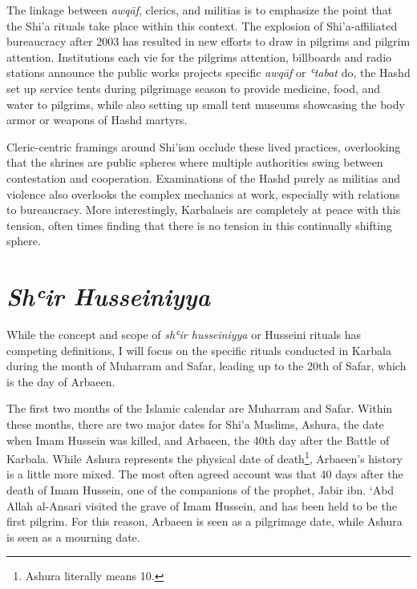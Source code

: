 The linkage between \emph{awqāf}, clerics, and militias is to emphasize the point that the Shi'a rituals take place within this context. The explosion of Shi'a-affiliated bureaucracy after 2003 has resulted in new efforts to draw in pilgrims and pilgrim attention. Institutions each vie for the pilgrims attention, billboards and radio stations announce the public works projects specific \emph{awqāf} or \emph{ʿtabat} do, the Hashd set up service tents during pilgrimage season to provide medicine, food, and water to pilgrims, while also setting up small tent museums showcasing the body armor or weapons of Hashd martyrs. 

Cleric-centric framings around Shi'ism occlude these lived practices, overlooking that the shrines are public spheres where multiple authorities swing between contestation and cooperation. Examinations of the Hashd purely as militias and violence also overlooks the complex mechanics at work, especially with relations to bureaucracy. More interestingly, Karbalaeis are completely at peace with this tension, often times finding that there is no tension in this continually shifting sphere.


\section{\emph{Shʿir Husseiniyya}}
While the concept and scope of \emph{shʿir husseiniyya} or Husseini rituals has competing definitions, I will focus on the specific rituals conducted in Karbala during the month of Muharram and Safar, leading up to the 20th of Safar, which is the day of Arbaeen. 

The first two months of the Islamic calendar are Muharram and Safar. Within these months, there are two major dates for Shi’a Muslims, Ashura, the date when Imam Hussein was killed, and Arbaeen, the 40th day after the Battle of Karbala. While Ashura represents the physical date of death\footnote{Ashura literally means 10.}, Arbaeen’s history is a little more mixed. The most often agreed account was that 40 days after the death of Imam Hussein, one of the companions of the prophet, Jabir ibn. ‘Abd Allah al-Ansari visited the grave of Imam Hussein, and has been held to be the first pilgrim. For this reason, Arbaeen is seen as a pilgrimage date, while Ashura is seen as a mourning date. 

